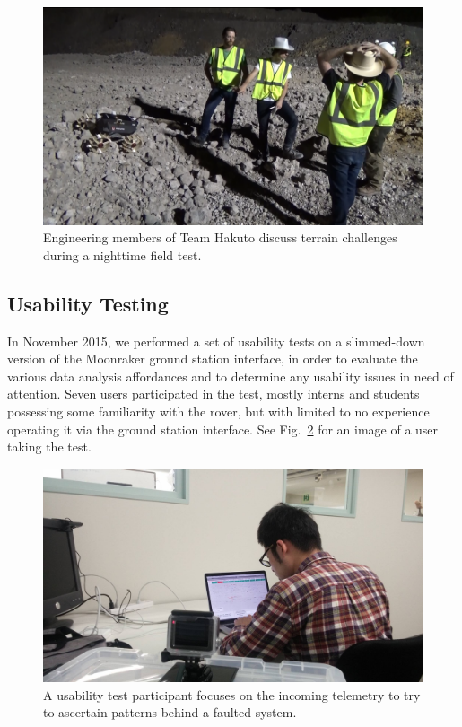 \begin{figure}[h]
\centering
    \includegraphics[width=\columnwidth]{images/night_test_team.png}
    \caption{Engineering members of Team Hakuto discuss terrain challenges during a nighttime field test.}
    \label{fig:night_test_team}
\end{figure}

\subsection{Usability Testing}

In November 2015, we performed a set of usability tests on a slimmed-down version of the Moonraker ground station interface, in order to evaluate the various data analysis affordances and to determine any usability issues in need of attention. Seven users participated in the test, mostly interns and students possessing some familiarity with the rover, but with limited to no experience operating it via the ground station interface. See Fig.~\ref{fig:ui_test_takako} for an image of a user taking the test.

\begin{figure}[h]
\centering
    \includegraphics[width=\columnwidth]{images/ui_test_takuto.jpg}
    \caption{A usability test participant focuses on the incoming telemetry to try to ascertain patterns behind a faulted system.}
    \label{fig:ui_test_takako}
\end{figure}

